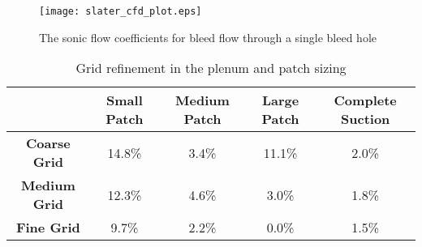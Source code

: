\begin{figure}[htbp] \begin{center}
    \texttt{[image: slater\_cfd\_plot.eps]}
    \caption{The sonic flow coefficients for bleed flow through a single bleed hole \cite{Shaw1976}}
     \label{fig:asdf} \end{center}
\end{figure}

\begin{table}[!htbp] \centering 
\begin{tabular}[c]{*{5}{c}} \hline
& \textbf{Small Patch} & \textbf{Medium Patch} & \textbf{Large Patch} & \textbf{Complete Suction} \\ \hline
\textbf{Coarse Grid} & 14.8\% & 3.4\% & 11.1\% & 2.0\% \\
\textbf{Medium Grid} & 12.3\% & 4.6\% &  3.0\% & 1.8\% \\
\textbf{Fine Grid}   &  9.7\% & 2.2\% &  0.0\% & 1.5\% \\ \hline
\end{tabular} 
\caption{Grid refinement in the plenum and patch sizing} 
\label{tab:results} \end{table}




